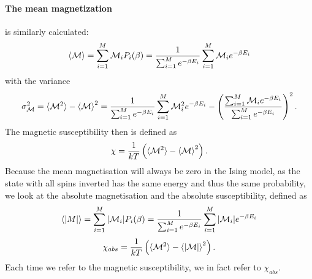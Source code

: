 \documentclass[10pt,a4paper]{article}
\begin{document}
\paragraph{The mean magnetization} is similarly calculated:
\begin{equation} \label{Mean magnetization definition equation}
 \braket{\mathcal{M}} = \sum_{i=1}^{M} \mathcal{M}_iP_i(\beta) = \frac{1}{\sum_{i=1}^M e^{-\beta E_i}} \sum_{i=1}^M \mathcal{M}_ie^{-\beta E_i}
\end{equation} 
with the variance
\begin{equation}
\sigma_\mathcal{M}^2 = \braket{\mathcal{M}^2}-\braket{\mathcal{M}}^2 = \frac{1}{\sum_{i=1}^M e^{-\beta E_i}} \sum_{i=1}^M \mathcal{M}_i^2e^{-\beta E_i} - \left( \frac{\sum_{i=1}^M \mathcal{M}_ie^{-\beta E_i}}{\sum_{i=1}^M e^{-\beta E_i}} \right)^2.
\end{equation}
The magnetic susceptibility then is defined as
\begin{equation}\label{Magnetic susceptibility definition equation}
\chi = \frac{1}{kT} \left( \braket{\mathcal{M}^2}-\braket{\mathcal{M}}^2 \right).
\end{equation}
Because the mean magnetisation will always be zero in the Ising model, as the state with all spins inverted has the same energy and thus the same probability, we look at the absolute magnetisation and the absolute susceptibility, defined as
\begin{equation} \label{Mean magnetization definition equation}
 \braket{|M|} = \sum_{i=1}^{M} |\mathcal{M}_i|P_i(\beta) = \frac{1}{\sum_{i=1}^M e^{-\beta E_i}} \sum_{i=1}^M |\mathcal{M}_i|e^{-\beta E_i}
\end{equation} 
\begin{equation}\label{Magnetic susceptibility definition equation}
\chi_{abs} = \frac{1}{kT} \left( \braket{\mathcal{M}^2}-\braket{|\mathcal{M}|}^2 \right).
\end{equation}
Each time we refer to the magnetic susceptibility, we in fact refer to $\chi_{abs}$.
\end{document}
